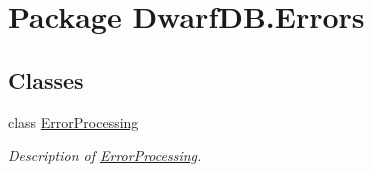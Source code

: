 \hypertarget{namespace_dwarf_d_b_1_1_errors}{\section{Package Dwarf\+D\+B.\+Errors}
\label{namespace_dwarf_d_b_1_1_errors}
}
\subsection*{Classes}
\begin{DoxyCompactItemize}
\item 
class \hyperlink{class_dwarf_d_b_1_1_errors_1_1_error_processing}{Error\+Processing}
\begin{DoxyCompactList}\small\item\em Description of \hyperlink{class_dwarf_d_b_1_1_errors_1_1_error_processing}{Error\+Processing}. \end{DoxyCompactList}\end{DoxyCompactItemize}

